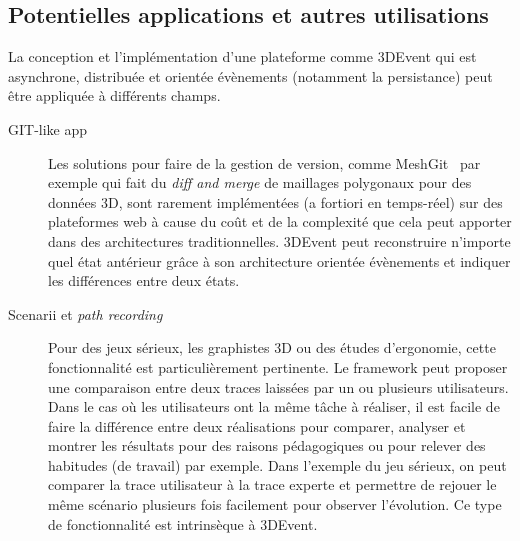 \subsection{Potentielles applications et autres utilisations}
La conception et l'implémentation d'une plateforme comme 3DEvent qui est 
asynchrone, distribuée et orientée évènements  (notamment la persistance) peut 
être appliquée à différents champs.
\begin{description}
	\item[GIT-like app] Les solutions pour faire de la gestion de version, comme 
	MeshGit~\cite{Denning2013} par exemple qui fait du
	\textit{diff and merge} de maillages polygonaux pour des données 3D, 
	sont rarement implémentées (a fortiori en 
	temps-réel) sur des plateformes web à cause du coût et de la complexité que 
	cela peut apporter dans des architectures traditionnelles. 3DEvent peut 
	reconstruire n'importe quel état antérieur grâce à son architecture orientée 
	évènements et indiquer les différences entre deux états.
	
	\item[Scenarii et \textit{path recording}] Pour des jeux sérieux, les graphistes 
	3D ou des études d'ergonomie, cette fonctionnalité est particulièrement 
	pertinente. Le \gls{framework} peut proposer une comparaison entre deux traces 
	laissées par un ou plusieurs utilisateurs. Dans le cas où les utilisateurs ont la 
	même tâche à réaliser, il est facile de faire la différence entre deux réalisations 
	pour comparer, analyser et montrer les résultats	pour des raisons 
	pédagogiques ou pour relever des habitudes (de travail) par exemple. Dans 
	l'exemple du jeu sérieux, on peut comparer la trace utilisateur à la trace experte 
	et permettre de rejouer le même scénario plusieurs fois facilement pour 
	observer l'évolution. Ce type de fonctionnalité est intrinsèque à 3DEvent. 
	

\end{description}
